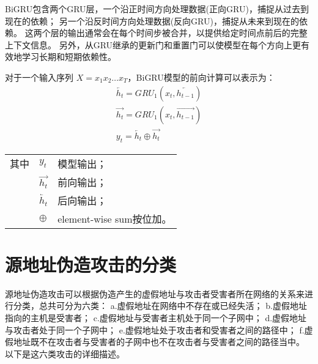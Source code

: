 BiGRU包含两个GRU层，一个沿正时间方向处理数据(正向GRU)，捕捉从过去到现在的依赖；
另一个沿反时间方向处理数据(反向GRU)，捕捉从未来到现在的依赖。
这两个层的输出通常会在每个时间步被合并，以提供给定时间点前后的完整上下文信息。
另外，从GRU继承的更新门和重置门可以使模型在每个方向上更有效地学习长期和短期依赖性。

对于一个输入序列 $X = x_1 x_2 \dots x_T$，BiGRU模型的前向计算可以表示为：
\begin{gather}
  \overleftarrow{h_t} = GRU_1(x_t,\overleftarrow{h_{t-1}}) \label{eq:bigru_htleft} \\
  \overrightarrow{h_t} = GRU_1(x_t,\overrightarrow{h_{t-1}}) \label{eq:bigru_htright} \\
  y_t = \overleftarrow{h_t} \oplus \overrightarrow{h_t} \label{eq:bigru_out}
\end{gather}
\begin{flushleft}
  \renewcommand\arraystretch{1.25}
  \begin{tabularx}{\textwidth}{@{}>{\normalsize\rm}l@{\quad}>{\normalsize\rm}l@{——}>{\normalsize\rm}X@{}}
  其中
  &  $y_t$ &模型输出；\\
  &  $\overrightarrow{h_t}$ &前向输出；\\
  &  $\overleftarrow{h_t} $ &后向输出；\\
  &  $\oplus$ & element-wise sum按位加。\\
  \end{tabularx}\vspace{.5ex}%
\end{flushleft}

\section{源地址伪造攻击的分类}

源地址伪造攻击可以根据伪造产生的虚假地址与攻击者受害者所在网络的关系来进行分类，总共可分为六类：
a.虚假地址在网络中不存在或已经失活；
b.虚假地址指向的主机是受害者；
c.虚假地址与受害者主机处于同一个子网中；
d.虚假地址与攻击者处于同一个子网中；
e.虚假地址处于攻击者和受害者之间的路径中；
f.虚假地址既不在攻击者与受害者的子网中也不在攻击者与受害者之间的路径当中\cite{Bi2010}。
以下是这六类攻击的详细描述。

